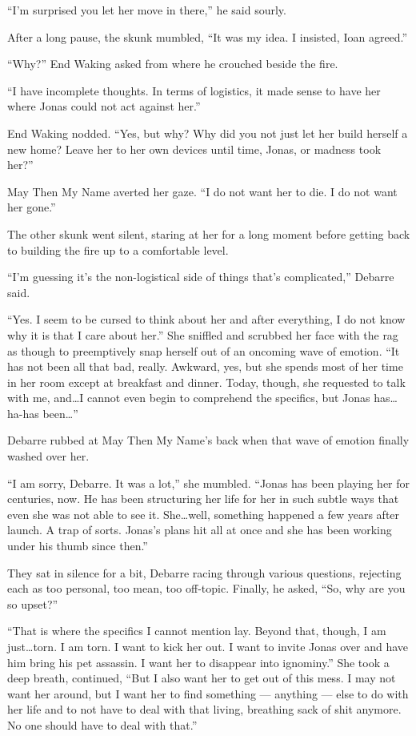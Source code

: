 ``I'm surprised you let her move in there,'' he said sourly.

After a long pause, the skunk mumbled, ``It was my idea. I insisted, Ioan agreed.''

``Why?'' End Waking asked from where he crouched beside the fire.

``I have incomplete thoughts. In terms of logistics, it made sense to have her where Jonas could not act against her.''

End Waking nodded. ``Yes, but why? Why did you not just let her build herself a new home? Leave her to her own devices until time, Jonas, or madness took her?''

May Then My Name averted her gaze. ``I do not want her to die. I do not want her gone.''

The other skunk went silent, staring at her for a long moment before getting back to building the fire up to a comfortable level.

``I'm guessing it's the non-logistical side of things that's complicated,'' Debarre said.

``Yes. I seem to be cursed to think about her and after everything, I do not know why it is that I care about her.'' She sniffled and scrubbed her face with the rag as though to preemptively snap herself out of an oncoming wave of emotion. ``It has not been all that bad, really. Awkward, yes, but she spends most of her time in her room except at breakfast and dinner. Today, though, she requested to talk with me, and\ldots I cannot even begin to comprehend the specifics, but Jonas has\ldots ha-has been\ldots{}''

Debarre rubbed at May Then My Name's back when that wave of emotion finally washed over her.

``I am sorry, Debarre. It was a lot,'' she mumbled. ``Jonas has been playing her for centuries, now. He has been structuring her life for her in such subtle ways that even she was not able to see it. She\ldots well, something happened a few years after launch. A trap of sorts. Jonas's plans hit all at once and she has been working under his thumb since then.''

They sat in silence for a bit, Debarre racing through various questions, rejecting each as too personal, too mean, too off-topic. Finally, he asked, ``So, why are you so upset?''

``That is where the specifics I cannot mention lay. Beyond that, though, I am just\ldots torn. I am torn. I want to kick her out. I want to invite Jonas over and have him bring his pet assassin. I want her to disappear into ignominy.'' She took a deep breath, continued, ``But I also want her to get out of this mess. I may not want her around, but I want her to find something — anything — else to do with her life and to not have to deal with that living, breathing sack of shit anymore. No one should have to deal with that.''

